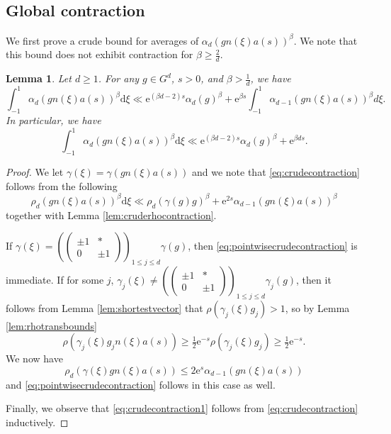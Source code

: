 \documentclass[12pt]{amsart}
\newtheorem{lem}[thm]{Lemma}
\theoremstyle{definition}
\theoremstyle{remark}
\numberwithin{equation}{section}
\newcommand{\dd}{\mathrm{d}}
\newcommand{\e}{\mathrm{e}}
\begin{document}
\subsection{Global contraction}
\label{sec:globalcontraction}

We first prove a crude bound for averages of $\alpha_d(gn(\xi)a(s))^{\beta}$.
We note that this bound does not exhibit contraction for $\beta \geq \tfrac{2}{d}$.
\begin{lem}
  \label{lem:crudecontraction}
  Let $d\geq 1$. For any $g \in G^d$, $s > 0$, and $\beta > \tfrac{1}{d}$, we have
  \begin{equation}
    \label{eq:crudecontraction}
    \int_{-1}^1 \alpha_d(gn(\xi)a(s))^\beta \dd \xi 
    \ll \e^{(\beta d- 2)s} \alpha_d(g)^\beta + \e^{\beta s}\int_{-1}^1 \alpha_{d-1}(gn(\xi)a(s))^\beta d \xi .
  \end{equation}
  In particular, we have
  \begin{equation}
    \label{eq:crudecontraction1}
    \int_{-1}^1 \alpha_d(gn(\xi)a(s))^\beta \dd \xi \ll \e^{(\beta d- 2)s} \alpha_d(g)^\beta + \e^{\beta d s}.
  \end{equation}
\end{lem}

\begin{proof}
  We let $\gamma(\xi) = \gamma(gn(\xi) a(s))$ and we note that \eqref{eq:crudecontraction} follows from the following
  \begin{equation}
    \label{eq:pointwisecrudecontraction}
    \rho_d(gn(\xi)a(s))^\beta \dd \xi \ll \rho_d(\gamma(g) g)^\beta + \e^{2s}\alpha_{d-1}(gn(\xi)a(s))^\beta
  \end{equation}
  together with Lemma \ref{lem:cruderhocontraction}. 

  If $\gamma(\xi) = \left(\begin{pmatrix}    \pm 1 & * \\
    0 & \pm 1
  \end{pmatrix}
  \right)_{\!\!1\leq j\leq d} \gamma(g)$, then \eqref{eq:pointwisecrudecontraction} is immediate.
  If for some $j$, $\gamma_j(\xi) \neq \left(\begin{pmatrix}    \pm 1 & * \\
    0 & \pm 1
  \end{pmatrix}
  \right)_{\!\!1\leq j\leq d} \gamma_j(g)$, then it follows from Lemma \ref{lem:shortestvector} that $\rho(\gamma_j(\xi)g_j) > 1$, so by Lemma \ref{lem:rhotransbounds}
  \begin{equation}
    \label{eq:rhogammajxichange}
    \rho(\gamma_j(\xi)g_j n(\xi) a(s)) \geq \tfrac{1}{2} \e^{-s} \rho(\gamma_j(\xi)g_j) \geq \tfrac{1}{2} \e^{-s}.
  \end{equation}
  We now have
  \begin{equation}
    \label{eq:gammachangebound}
    \rho_d(\gamma(\xi)gn(\xi)a(s)) \leq 2 \e^s \alpha_{d-1}(gn(\xi)a(s))
  \end{equation}
  and \eqref{eq:pointwisecrudecontraction} follows in this case as well.

  Finally, we observe that \eqref{eq:crudecontraction1} follows from \eqref{eq:crudecontraction} inductively. 
\end{proof}
\end{document}
